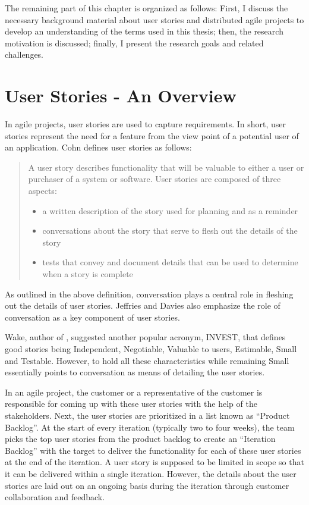 The remaining part of this chapter is organized as follows: First, I discuss the necessary background material about user stories and distributed agile projects to develop an understanding of the terms used in this thesis; then, the research motivation is discussed; finally, I present the research goals and related challenges.

\section{User Stories - An Overview}
In agile projects, user stories are used to capture requirements. In short, user stories represent the need for a feature from the view point of a potential user of an application. Cohn \cite{user_stories_applied} defines user stories as follows:\\

\begin{quote}
	A user story describes functionality that will be valuable to either a user or purchaser of a system or software. User stories are composed of three aspects:
	\begin{itemize}
		\item a written description of the story used for planning and as a reminder
		\item conversations about the story that serve to flesh out the details of the story
		\item tests that convey and document details that can be used to determine when a story is complete
	\end{itemize}
\end{quote}

As outlined in the above definition, conversation plays a central role in fleshing out the details of user stories. Jeffries \cite{ron_jeffries} and Davies\cite{rachel_davies} also emphasize the role of conversation as a key component of user stories.

Wake, author of \cite{bill_wake}, suggested another popular acronym, INVEST, that defines good stories being Independent, Negotiable, Valuable to users, Estimable, Small and Testable. However, to hold all these characteristics while remaining Small essentially points to conversation as means of detailing the user stories.

In an agile project, the customer or a representative of the customer is responsible for coming up with these user stories with the help of the stakeholders. Next, the user stories are prioritized in a list known as ``Product Backlog''. At the start of every iteration (typically two to four weeks), the team picks the top user stories from the product backlog to create an ``Iteration Backlog'' with the target to deliver the functionality for each of these user stories at the end of the iteration. A user story is supposed to be limited in scope so that it can be delivered within a single iteration. However, the details about the user stories are laid out on an ongoing basis during the iteration through customer collaboration and feedback.


